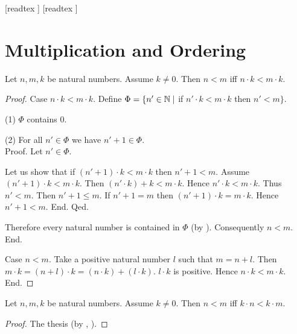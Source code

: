 \documentclass[10pt]{article}
\begin{document}
  \begin{imports}
    \begin{forthel}
      [readtex ]
      [readtex ]
    \end{forthel}
  \end{imports}


  \section*{Multiplication and Ordering}

  \begin{forthel}
    \begin{proposition}[id=ARITHMETIC_06_8817333933965312,printid]
      Let $n, m, k$ be natural numbers.
      Assume $k \neq 0$.
      Then $n < m$ iff $n \cdot k < m \cdot k$.
    \end{proposition}
    \begin{proof}
      Case $n \cdot k < m \cdot k$.
        Define $\Phi = \{ n' \in \mathbb{N} \mid$ if $n' \cdot k < m \cdot k$ then $n' < m \}$.

        (1) $\Phi$ contains $0$.

        (2) For all $n' \in \Phi$ we have $n' + 1 \in \Phi$. \\
        Proof.
          Let $n' \in \Phi$.

          Let us show that if $(n' + 1) \cdot k < m \cdot k$ then $n' + 1 < m$.
            Assume $(n' + 1) \cdot k < m \cdot k$.
            Then $(n' \cdot k) + k < m \cdot k$.
            Hence $n' \cdot k < m \cdot k$.
            Thus $n' < m$.
            Then $n' + 1 \leq m$.
            If $n' + 1 = m$ then $(n' + 1) \cdot k = m \cdot k$.
            Hence $n' + 1 < m$.
          End.
        Qed.

        Therefore every natural number is contained in $\Phi$ (by ).
        Consequently $n < m$.
      End.

      Case $n < m$.
        Take a positive natural number $l$ such that $m = n + l$.
        Then $m \cdot k = (n + l) \cdot k = (n \cdot k) + (l \cdot k)$.
        $l \cdot k$ is positive.
        Hence $n \cdot k < m \cdot k$.
      End.
    \end{proof}
  \end{forthel}

  \begin{forthel}
    \begin{corollary}[id=ARITHMETIC_06_5048640368279552,printid]
      Let $n, m, k$ be natural numbers.
      Assume $k \neq 0$.
      Then $n < m$ iff $k \cdot n < k \cdot m$.
    \end{corollary}
    \begin{proof}
      The thesis (by , ).
    \end{proof}
  \end{forthel}
\end{document}
